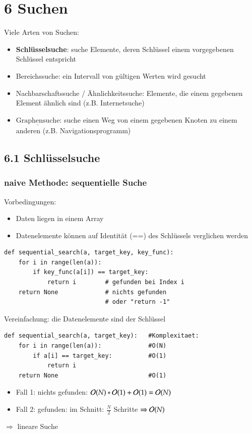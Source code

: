 
\chapter*{6 Suchen}
Viele Arten von Suchen:
\begin{itemize}
    \item \textbf{Schlüsselsuche}: suche Elemente, deren Schlüssel einem vorgegebenen Schlüssel entspricht
    \item Bereichssuche: ein Intervall von gültigen Werten wird gesucht
    \item Nachbarschaftssuche / Ähnlichkeitssuche: Elemente, die einem gegebenen Element ähnlich sind (z.B. Internetsuche)
    \item $\underline{\text{Graphensuche}}$: suche einen Weg von einem gegebenen Knoten zu einem anderen (z.B. Navigationsprogramm)
\end{itemize}

\section*{6.1 Schlüsselsuche}

\subsection*{naive Methode: sequentielle Suche}
Vorbedingungen:
\begin{itemize}
    \item Daten liegen in einem Array
    \item Datenelemente können auf Identität (==) des Schlüssels verglichen werden
\end{itemize}

\begin{verbatim}
def sequential_search(a, target_key, key_func):
    for i in range(len(a)):
        if key_func(a[i]) == target_key:
            return i        # gefunden bei Index i
    return None             # nichts gefunden
                            # oder "return -1"
    \end{verbatim}

    Vereinfachung: die Datenelemente sind der Schlüssel

    \begin{verbatim}
def sequential_search(a, target_key):   #Komplexitaet:
    for i in range(len(a)):             #O(N)
        if a[i] == target_key:          #O(1)
            return i
    return None                         #O(1)
        \end{verbatim}
        \begin{itemize}
            \item Fall 1: nichts gefunden: $\mathcal{O}{}(N) * \mathcal{O}{}(1) + \mathcal{O}{}(1) = \mathcal{O}{}(N)$
            \item Fall 2: gefunden: im Schnitt: $\frac{N}{2}$ Schritte $\Rightarrow \mathcal{O}{}(N)$
        \end{itemize}
        $\Rightarrow$ \glqq lineare Suche\grqq

